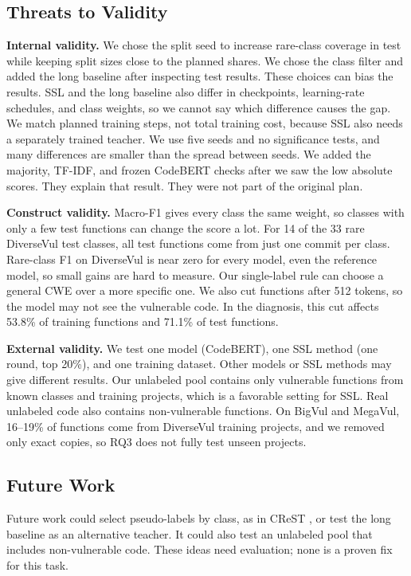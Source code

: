 \documentclass[conference]{IEEEtran}
\begin{document}
\subsection{Threats to Validity}\label{threats-to-validity}

\textbf{Internal validity.} We chose the split seed to increase
rare-class coverage in test while keeping split sizes close to the
planned shares. We chose the class filter and added the long baseline
after inspecting test results. These choices can bias the results. SSL
and the long baseline also differ in checkpoints, learning-rate
schedules, and class weights, so we cannot say which difference causes
the gap. We match planned training steps, not total training cost,
because SSL also needs a separately trained teacher. We use five seeds
and no significance tests, and many differences are smaller than the
spread between seeds.
We added the majority, TF-IDF, and frozen CodeBERT checks after we saw the low absolute scores. They explain that result. They were not part of the original plan.

\textbf{Construct validity.} Macro-F1 gives every class the same weight,
so classes with only a few test functions can change the score a lot.
For 14 of the 33 rare DiverseVul test classes, all test functions come
from just one commit per class. Rare-class F1 on DiverseVul is near zero
for every model, even the reference model, so small gains are hard to
measure. Our single-label rule can choose a general CWE over a more
specific one. We also cut functions after 512 tokens, so the model may
not see the vulnerable code.
In the diagnosis, this cut affects 53.8\% of training functions and 71.1\% of test functions.

\textbf{External validity.} We test one model (CodeBERT), one SSL method
(one round, top 20\%), and one training dataset. Other models or SSL
methods may give different results. Our unlabeled pool contains only
vulnerable functions from known classes and training projects, which is
a favorable setting for SSL. Real unlabeled code also contains
non-vulnerable functions. On BigVul and MegaVul, 16--19\% of functions
come from DiverseVul training projects, and we removed only exact
copies, so RQ3 does not fully test unseen projects.

\subsection{Future Work}\label{future-work}

Future work could select pseudo-labels by class, as in CReST
\cite{wei2021crest}, or test the long baseline as an alternative
teacher. It could also test an unlabeled pool that includes
non-vulnerable code. These ideas need evaluation; none is a proven fix
for this task.
\end{document}
